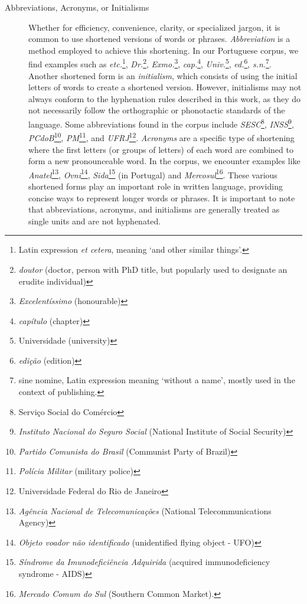 \begin{description}
    \item [Abbreviations, Acronyms, or Initialisms\label{abbrev}] 
       Whether for efficiency, convenience, clarity, or specialized jargon, 
       it is common to use shortened versions of words or phrases. \emph{Abbreviation} is 
       a method employed to achieve this shortening. In our Portuguese corpus, we find examples such as 
       \emph{etc.}\footnote{Latin expression \emph{et cetera}, meaning `and other similar things'.}, 
       \emph{Dr.}\footnote{\emph{doutor} (doctor, person with PhD title, but popularly used to designate an erudite individual)}, 
       \emph{Exmo.}\footnote{\emph{Excelentíssimo} (honourable)},
       \emph{cap.}\footnote{\emph{capítulo} (chapter)}, \emph{Univ.}\footnote{Universidade (university)}, 
       \emph{ed.}\footnote{\emph{edição} (edition)}, 
       \emph{s.n.}\footnote{sine nomine, Latin expression meaning `without a name', mostly used in the context of publishing.}.
       Another shortened form is an \emph{initialism}, which consists of using
       the initial letters of words to create a shortened version. However,
       initialisms may not always conform to the hyphenation rules described in
       this work, as they do not necessarily follow the orthographic or
       phonotactic standards of the language. Some abbreviations found in the
       corpus include 
       \emph{SESC}\footnote{Serviço Social do Comércio}, 
       \emph{INSS}\footnote{\emph{Instituto Nacional do Seguro Social} (National Institute of Social Security)}, 
       \emph{PCdoB}\footnote{\emph{Partido Comunista do Brasil} (Communist Party of Brazil)},
       \emph{PM}\footnote{\emph{Polícia Militar} (military police)}, and 
       \emph{UFRJ}\footnote{Universidade Federal do Rio de Janeiro}.
       \emph{Acronyms} are a specific type of shortening where the first letters (or
       groups of letters) of each word are combined to form a new pronounceable
       word. In the corpus, we encounter examples like 
       \emph{Anatel}\footnote{\emph{Agência Nacional de Telecomunicações} (National Telecommunications Agency)},
       \emph{Ovni}\footnote{\emph{Objeto voador não identificado} (unidentified flying object - UFO)},
       \emph{Sida}\footnote{\emph{Síndrome da Imunodeficiência Adquirida} (acquired immunodeficiency syndrome - AIDS)} (in Portugal) and
       \emph{Mercosul}\footnote{\emph{Mercado Comum do Sul} (Southern Common Market).}.
       These various shortened forms play an important role in written
       language, providing concise ways to represent longer words or phrases.
       It is important to note that abbreviations, acronyms, and initialisms
       are generally treated as single units and are not hyphenated.

\end{description}



